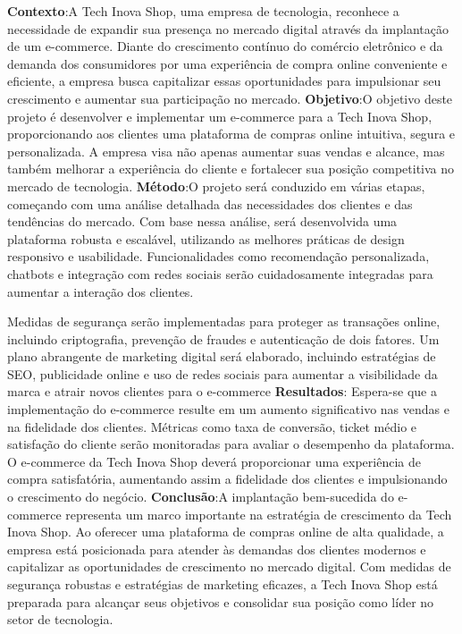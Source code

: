 
\centeredchapterstyle
\begin{resumo}
    \noindent\textbf{Contexto}:A Tech Inova Shop, uma empresa de tecnologia, reconhece a necessidade de expandir sua presença no mercado digital através da implantação de um e-commerce. Diante do crescimento contínuo do comércio eletrônico e da demanda dos consumidores por uma experiência de compra online conveniente e eficiente, a empresa busca capitalizar essas oportunidades para impulsionar seu crescimento e aumentar sua participação no mercado. \textbf{Objetivo}:O objetivo deste projeto é desenvolver e implementar um e-commerce para a Tech Inova Shop, proporcionando aos clientes uma plataforma de compras online intuitiva, segura e personalizada. A empresa visa não apenas aumentar suas vendas e alcance, mas também melhorar a experiência do cliente e fortalecer sua posição competitiva no mercado de tecnologia. \textbf{Método}:O projeto será conduzido em várias etapas, começando com uma análise detalhada das necessidades dos clientes e das tendências do mercado. Com base nessa análise, será desenvolvida uma plataforma robusta e escalável, utilizando as melhores práticas de design responsivo e usabilidade. Funcionalidades como recomendação personalizada, chatbots e integração com redes sociais serão cuidadosamente integradas para aumentar a interação dos clientes.

Medidas de segurança serão implementadas para proteger as transações online, incluindo criptografia, prevenção de fraudes e autenticação de dois fatores. Um plano abrangente de marketing digital será elaborado, incluindo estratégias de SEO, publicidade online e uso de redes sociais para aumentar a visibilidade da marca e atrair novos clientes para o e-commerce \textbf{Resultados}: Espera-se que a implementação do e-commerce resulte em um aumento significativo nas vendas e na fidelidade dos clientes. Métricas como taxa de conversão, ticket médio e satisfação do cliente serão monitoradas para avaliar o desempenho da plataforma. O e-commerce da Tech Inova Shop deverá proporcionar uma experiência de compra satisfatória, aumentando assim a fidelidade dos clientes e impulsionando o crescimento do negócio. \textbf{Conclusão}:A implantação bem-sucedida do e-commerce representa um marco importante na estratégia de crescimento da Tech Inova Shop. Ao oferecer uma plataforma de compras online de alta qualidade, a empresa está posicionada para atender às demandas dos clientes modernos e capitalizar as oportunidades de crescimento no mercado digital. Com medidas de segurança robustas e estratégias de marketing eficazes, a Tech Inova Shop está preparada para alcançar seus objetivos e consolidar sua posição como líder no setor de tecnologia.
\end{resumo}
